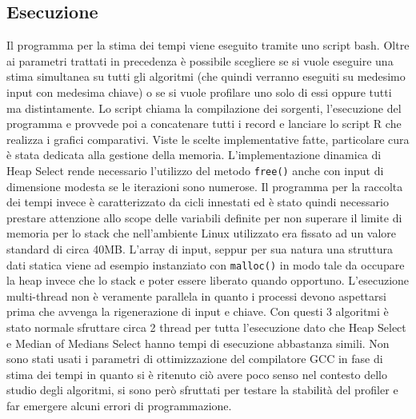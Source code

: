 \documentclass{article}
\begin{document}
\subsection{Esecuzione}
Il programma per la stima dei tempi viene eseguito tramite uno script bash.
\newline
Oltre ai parametri trattati in precedenza è possibile scegliere se si vuole eseguire una stima simultanea su tutti gli algoritmi (che quindi verranno eseguiti su medesimo input con medesima chiave) o se si vuole profilare uno solo di essi oppure tutti ma distintamente.
\newline
\newline
Lo script chiama la compilazione dei sorgenti, l'esecuzione del programma e provvede poi a concatenare tutti i record e lanciare lo script R che realizza i grafici comparativi.
\newline
\newline
Viste le scelte implementative fatte, particolare cura è stata dedicata alla gestione della memoria.
\newline
\newline
L'implementazione dinamica di Heap Select rende necessario l'utilizzo del metodo \texttt{free()} anche con input di dimensione modesta se le iterazioni sono numerose.
\newline
\newline
Il programma per la raccolta dei tempi invece è caratterizzato da cicli innestati ed è stato quindi necessario prestare attenzione allo scope delle variabili definite per non superare il limite di memoria per lo stack che nell'ambiente Linux utilizzato era fissato ad un valore standard di circa 40MB.
\newline
L'array di input, seppur per sua natura una struttura dati statica viene ad esempio instanziato con \texttt{malloc()} in modo tale da occupare la heap invece che lo stack e poter essere liberato quando opportuno.
\newline
\newline
L'esecuzione multi-thread non è veramente parallela in quanto i processi devono aspettarsi prima che avvenga la rigenerazione di input e chiave. Con questi 3 algoritmi è stato normale sfruttare circa 2 thread per tutta l'esecuzione dato che Heap Select e Median of Medians Select hanno tempi di esecuzione abbastanza simili.
\newline
\newline
Non sono stati usati i parametri di ottimizzazione del compilatore GCC in fase di stima dei tempi in quanto si è ritenuto ciò avere poco senso nel contesto dello studio degli algoritmi, si sono però sfruttati per testare la stabilità del profiler e far emergere alcuni errori di programmazione.
\end{document}
